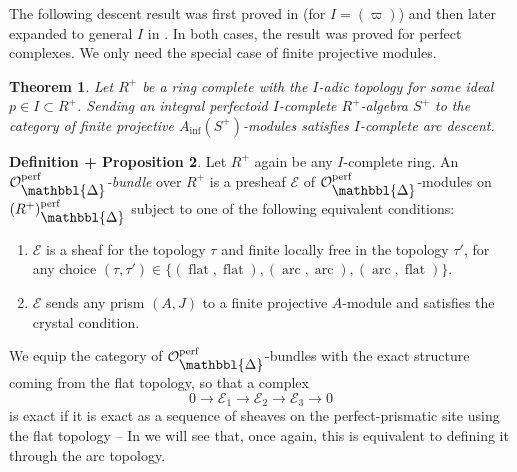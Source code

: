 \documentclass[10pt,twoside]{article}
\numberwithin{equation}{section}
\theoremstyle{plain}
\newtheorem{mythm}{Theorem}[section]
\theoremstyle{definition}
\newtheorem{mydefprop}[mythm]{Definition + Proposition}
\newcommand{\MCE}{\mathcal{E}}
\newcommand{\MCO}{\mathcal{O}}
\DeclareMathOperator{\perf}{perf}
\DeclareMathOperator{\arc}{arc}
\newcommand{\Prism}{{\mathlarger{\mathbbl{\Delta}}}}
\DeclareMathOperator{\Inf}{inf}
\DeclareMathOperator{\Flat}{flat}
\newcommand{\Ainf}{A_{\Inf}}
\newcommand{\OpP}{\MCO^{\perf}_{\Prism}}
\begin{document}
The following descent result was first proved in \cite[Theorem 1.2]{Ito} (for \(I=(\varpi)\)) and then later expanded to general \(I\) in \cite{Takaya}. In both cases, the result was proved for perfect complexes. We only need the special case of finite projective modules.


\begin{mythm}\label{takaya}\emph{\cite[Proposition 4.17]{Takaya}} Let \(R^+\) be a ring complete with the \(I\)-adic topology for some ideal \(p\in I\subset R^+\). Sending an integral perfectoid \(I\)-complete \(R^+\)-algebra \(S^+\) to the category of finite projective \(\Ainf(S^+)\)-modules satisfies \(I\)-complete arc descent.
\end{mythm}

\begin{mydefprop}\label{equivalentDefsOfPrismaticBundles}
Let \(R^+\) again be any \(I\)-complete ring. An \emph{\(\MCO^{\perf}_{\Prism}\)-bundle} over \(R^+\) is a presheaf \(\MCE\) of \(\OpP\)-modules on \((R^+)_{\Prism}^{\perf}\) subject to one of the following equivalent conditions:

\begin{enumerate}
    \item \(\MCE\) is a sheaf for the topology \(\tau\) and finite locally free in the topology \(\tau'\), for any choice \((\tau,\tau')\in \{(\Flat,\Flat),(\arc,\arc),(\arc,\Flat)\}\).
    \item \(\MCE\) sends any prism \((A,J)\) to a finite projective \(A\)-module and satisfies the crystal condition.
\end{enumerate}
We equip the category of \(\MCO^{\perf}_{\Prism}\)-bundles with the exact structure coming from the flat topology, so that a complex 
\[0\longrightarrow\MCE_1\longrightarrow\MCE_2\longrightarrow\MCE_3\longrightarrow0\] is exact if it is exact as a sequence of sheaves on the perfect-prismatic site using the flat topology -- In  we will see that, once again, this is equivalent to defining it through the arc topology.
\end{mydefprop}
\end{document}
